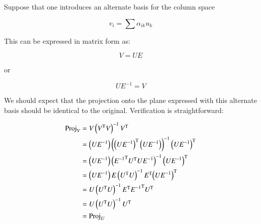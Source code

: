 \documentclass{article}      %
\DeclareMathOperator{\TextTranspose}{T}
\newcommand{\transpose}[1]{{{#1}^{\TextTranspose}}}
\begin{document}
Suppose that one introduces an alternate basis for the column space

\[
v_i = \sum \alpha_{ik} u_k
\]

This can be expressed in matrix form as:

\[
V = U E
\]

or

\[
U E^{-1} = V
\]

We should expect that the projection onto the plane expressed with this alternate basis should be identical to the original.  Verification
is straightforward:

\begin{align*}
\Proj_V 
&= V \left(\transpose{V} V\right)^{-1} \transpose{V} \\
&= \left(U E^{-1}\right) \left(\transpose{\left(U E^{-1}\right)} \left(U E^{-1}\right)\right)^{-1} \transpose{\left(U E^{-1}\right)} \\
&= \left(U E^{-1}\right) \left( \transpose{E^{-1}} \transpose{U} U E^{-1}\right)^{-1} \transpose{\left(U E^{-1}\right)} \\
&= \left(U E^{-1}\right) E \left( \transpose{U}U\right)^{-1} \transpose{E} \transpose{\left(U E^{-1}\right)} \\
&= U \left( \transpose{U}U\right)^{-1} \transpose{E} \transpose{E^{-1}} \transpose{U} \\
&= U \left( \transpose{U}U\right)^{-1} \transpose{U} \\
&= \Proj_U
\end{align*}
\end{document}
